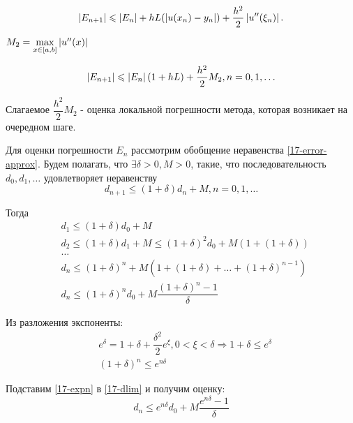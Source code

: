 \begin{equation}
  \left\lvert E_{n + 1} \right\rvert \leqslant \left\lvert E_n \right\rvert + hL(\left\lvert u(x_n) - y_n \right\rvert) + \dfrac{h^2}{2}
  \left\lvert u''(\xi_n) \right\rvert.
\end{equation}

\begin{definition}
  $M_2 = \underset{x \in [a, b]}{\max} \left\lvert u''(x) \right\rvert$
\end{definition}

\begin{equation}
  \label{17-error-approx}
  \left\lvert E_{n + 1} \right\rvert \leqslant \left\lvert E_n \right\rvert(1 + hL) + \dfrac{h^2}{2}M_2, n = 0, 1,
  \ldots
\end{equation}

Слагаемое $\dfrac{h^2}{2}M_2$ - оценка локальной погрешности метода, которая
возникает на очередном шаге.

Для оценки погрешности $E_n$ рассмотрим обобщение неравенства
\eqref{17-error-approx}. Будем полагать, что $\exists \delta > 0, M > 0$,
такие, что последовательность $d_0, d_1, \ldots$ удовлетворяет неравенству
\begin{equation}
  d_{n + 1} \leqslant (1 + \delta)d_n + M, n = 0, 1, \ldots
\end{equation}

Тогда
\begin{align}
  \nonumber
  &d_1 \leqslant (1 + \delta)d_0 + M\\
  \nonumber
  &d_2 \leqslant (1 + \delta)d_1 + M \leqslant (1 + \delta)^2d_0 +
  M(1 + (1 + \delta))\\
  \nonumber
  &\ldots\\
  &d_n \leqslant (1 + \delta)^n + M(1 + (1 + \delta) + \ldots
  + (1 + \delta)^{n - 1})\\
  \label{17-dlim}
  &d_n \leqslant (1 + \delta)^nd_0 + M\dfrac{(1 + \delta)^n - 1}{\delta}
\end{align}

Из разложения экспоненты:
\begin{align}
  &e^{\delta} = 1 + \delta + \dfrac{\delta^2}{2}e^{\xi}, 0 < \xi < \delta
  \Rightarrow 1 + \delta \leqslant e^{\delta}\\
  \label{17-expn}
  &(1 + \delta)^n \leqslant e^{n\delta}
\end{align}

Подставим \eqref{17-expn} в \eqref{17-dlim} и получим оценку:
\begin{equation}
  \label{17-dlim2}
  d_n \leqslant e^{n\delta}d_0 + M\dfrac{e^{n\delta} - 1}{\delta}
\end{equation}

